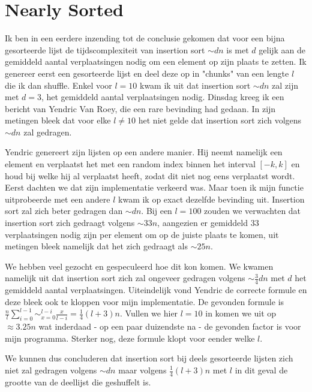 \documentclass[a4paper]{article}
\begin{document}
\section{Nearly Sorted}
Ik ben in een eerdere inzending tot de conclusie gekomen dat voor een bijna gesorteerde lijst de tijdscomplexiteit van insertion sort $\sim dn$ is met $d$ gelijk aan
de gemiddeld aantal verplaatsingen nodig om een element op zijn plaats te zetten. Ik genereer eerst een gesorteerde lijst en deel deze op in "chunks" van een lengte $l$
die ik dan shuffle. Enkel voor $l=10$ kwam ik uit dat insertion sort $\sim dn$ zal zijn met $d=3$, het gemiddeld aantal verplaatsingen nodig.
Dinsdag kreeg ik een bericht van Yendric Van Roey, die een rare bevinding had gedaan. In zijn metingen bleek dat voor elke $l \ne 10$ het niet gelde dat insertion sort
zich volgens $\sim dn$ zal gedragen.
\par
Yendric genereert zijn lijsten op een andere manier. Hij neemt namelijk een element en verplaatst het met een random index binnen het interval $[-k,k]$ en houd bij
welke hij al verplaatst heeft, zodat dit niet nog eens verplaatst wordt. Eerst dachten we dat zijn implementatie verkeerd was. Maar toen ik mijn functie uitprobeerde
met een andere $l$ kwam ik op exact dezelfde bevinding uit. Insertion sort zal zich beter gedragen dan $\sim dn$. Bij een $l=100$ zouden we verwachten dat insertion sort
zich gedraagt volgens $\sim 33n$, aangezien er gemiddeld 33 verplaatsingen nodig zijn per element om op de juiste plaats te komen, 
uit metingen bleek namelijk dat het zich gedraagt als $\sim 25n$.
\par
We hebben veel gezocht en gespeculeerd hoe dit kon komen. We kwamen namelijk uit dat insertion sort zich zal ongeveer gedragen volgens $\sim \frac{3}{4}dn$ met $d$
het gemiddeld aantal verplaatsingen. Uiteindelijk vond Yendric de correcte formule en deze bleek ook te kloppen voor mijn implementatie.
De gevonden formule is $\frac{n}{l}\sum_{i=0}^{l-1}\sim_{x=0}^{l-i}\frac{x}{l-i}=\frac{1}{4}(l+3)n$. Vullen we hier $l=10$ in komen we uit op $\approx 3.25n$ wat
inderdaad - op een paar duizendste na - de gevonden factor is voor mijn programma. Sterker nog, deze formule klopt voor eender welke $l$.
\par
We kunnen dus concluderen dat insertion sort bij deels gesorteerde lijsten zich niet zal gedragen volgens $\sim dn$ maar volgens $\frac{1}{4}(l+3)n$ met $l$ in dit
geval de grootte van de deellijst die geshuffelt is. 
\end{document}
